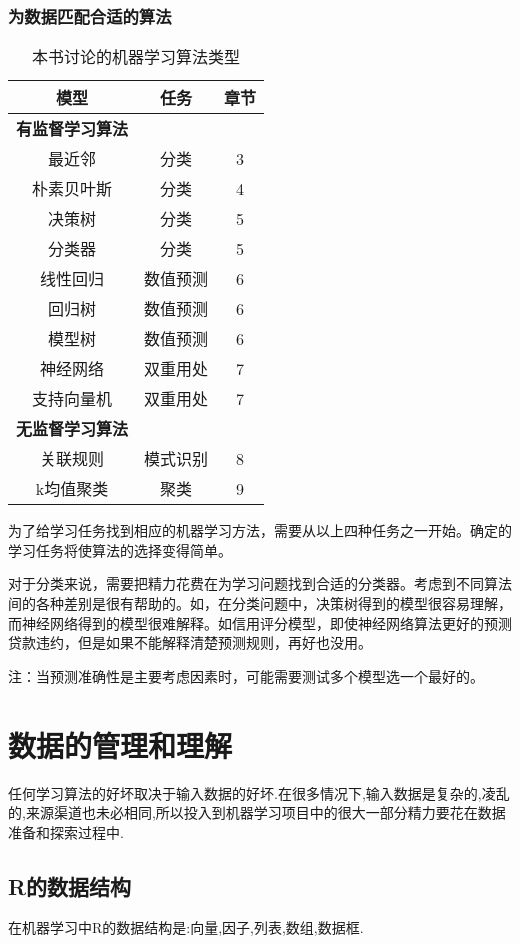 \documentclass[11pt,a4paper,oneside]{book}
\begin{document}
\subsection{为数据匹配合适的算法}
\begin{table}[H]   %
	\caption{本书讨论的机器学习算法类型}\label{tab:001} \centering
	\begin{tabular}{ccc}
		\toprule[1.5pt]
		模型 & 任务 & 章节 \\
		\midrule[1pt]
		\textbf{有监督学习算法} & &\\
		最近邻 & 分类 & 3\\
		朴素贝叶斯 & 分类 & 4 \\
		决策树&分类&5\\
		分类器&分类&5\\
		线性回归&数值预测&6\\
		回归树&数值预测&6\\
		模型树&数值预测&6\\
		神经网络&双重用处&7\\
		支持向量机&双重用处&7\\
		\textbf{无监督学习算法}& & \\
		关联规则&模式识别&8\\
		k均值聚类&聚类&9\\
		\bottomrule[1.5pt]
	\end{tabular}
\end{table}
为了给学习任务找到相应的机器学习方法，需要从以上四种任务之一开始。确定的学习任务将使算法的选择变得简单。

对于分类来说，需要把精力花费在为学习问题找到合适的分类器。考虑到不同算法间的各种差别是很有帮助的。如，在分类问题中，决策树得到的模型很容易理解，而神经网络得到的模型很难解释。如信用评分模型，即使神经网络算法更好的预测贷款违约，但是如果不能解释清楚预测规则，再好也没用。

\begin{tcolorbox}[colback=pink!10!white,colframe=pink!100!black]
注：当预测准确性是主要考虑因素时，可能需要测试多个模型选一个最好的。
\end{tcolorbox}

\chapter{数据的管理和理解}
任何学习算法的好坏取决于输入数据的好坏.在很多情况下,输入数据是复杂的,凌乱的,来源渠道也未必相同,所以投入到机器学习项目中的很大一部分精力要花在数据准备和探索过程中.

\section{R的数据结构}
在机器学习中R的数据结构是:向量,因子,列表,数组,数据框.
\end{document}

